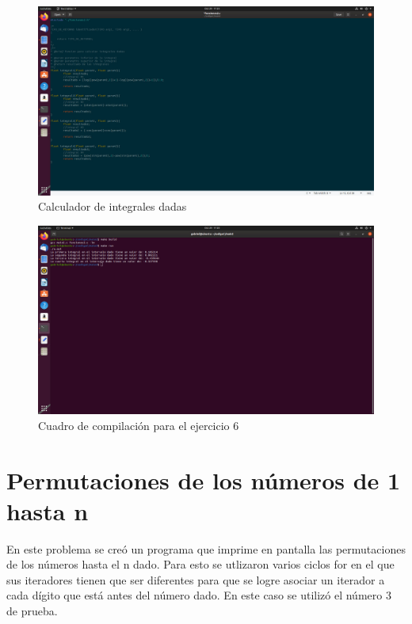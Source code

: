 \documentclass[
  letterpaper, 
  maincolor=black,
  sectioncolor=black!90,
  subsectioncolor=black!70,
  itemtextcolor=black!40,
]{fortysecondscv}
\begin{document}
        \begin{figure}[H]
            \centering
            \includegraphics[trim= 30 120 600 30,clip,width=1.20\textwidth]{img/eje6.jpg}
            \caption{Calculador de integrales dadas}
            \label{fig:my_label}
        \end{figure}
        \begin{figure}[H]
            \centering
            \includegraphics[trim= 0 550 700 0,clip,width=1.20\textwidth]{img/pb6.jpg}
            \caption{Cuadro de compilación para el ejercicio 6}
            \label{fig:my_label}
        \end{figure}
        \newpage
        
    \section{Permutaciones de los números de 1 hasta n}
        En este problema se creó un programa que imprime en pantalla las permutaciones de los números hasta el n dado. Para esto se utlizaron varios ciclos for en el que sus iteradores tienen que ser diferentes para que se logre asociar un iterador a cada dígito que está antes del número dado. En este caso se utilizó el número 3 de prueba.
    
\end{document}
